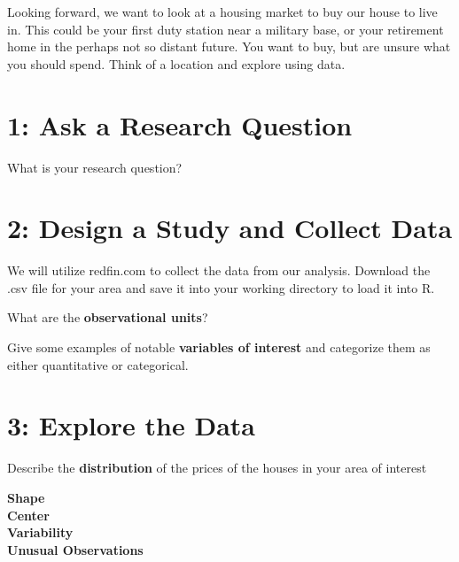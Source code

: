 \documentclass{article}
\newif\ifPrintSolution
\newcommand{\sol}[1]{\ifPrintSolution {\color{blue} #1 } \fi}
\begin{document}
\sol{Are there \textbf{outliers} which are very different from most observations? Can this difference be explained? Could it be entered in error?}
\vfill

\pagebreak

Looking forward, we want to look at a housing market to buy our house to live in. This could be your first duty station near a military base, or your retirement home in the perhaps not so distant future. You want to buy, but are unsure what you should spend. Think of a location and explore using data.

\section*{1: Ask a Research Question}

What is your research question?

\vspace{0.5 in}

\section*{2: Design a Study and Collect Data}

We will utilize redfin.com to collect the data from our analysis. Download the .csv file for your area and save it into your working directory to load it into R.

What are the \textbf{observational units}?

\vspace{0.25 in}

Give some examples of notable \textbf{variables of interest} and categorize them as either quantitative or categorical.

\vspace{0.5 in}


\section*{3: Explore the Data}

Describe the \textbf{distribution} of the prices of the houses in your area of interest

\textbf{Shape}\\

\textbf{Center}\\

\textbf{Variability}\\

\textbf{Unusual Observations}
\end{document}
